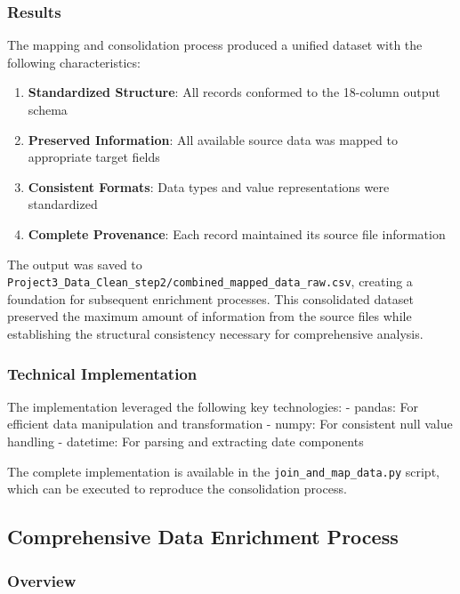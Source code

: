 \documentclass[12pt]{article}
\providecommand{\tightlist}{%
  \setlength{\itemsep}{0pt}\setlength{\parskip}{0pt}}
\begin{document}
\subsubsection{Results}\label{results}

The mapping and consolidation process produced a unified dataset with
the following characteristics:

\begin{enumerate}
\def\labelenumi{\arabic{enumi}.}
\tightlist
\item
  \textbf{Standardized Structure}: All records conformed to the
  18-column output schema
\item
  \textbf{Preserved Information}: All available source data was mapped
  to appropriate target fields
\item
  \textbf{Consistent Formats}: Data types and value representations were
  standardized
\item
  \textbf{Complete Provenance}: Each record maintained its source file
  information
\end{enumerate}

The output was saved to
\texttt{Project3\_Data\_Clean\_step2/combined\_mapped\_data\_raw.csv},
creating a foundation for subsequent enrichment processes. This
consolidated dataset preserved the maximum amount of information from
the source files while establishing the structural consistency necessary
for comprehensive analysis.

\subsubsection{Technical
Implementation}\label{technical-implementation-1}

The implementation leveraged the following key technologies: - pandas:
For efficient data manipulation and transformation - numpy: For
consistent null value handling - datetime: For parsing and extracting
date components

The complete implementation is available in the
\texttt{join\_and\_map\_data.py} script, which can be executed to
reproduce the consolidation process.

\subsection{Comprehensive Data Enrichment
Process}\label{comprehensive-data-enrichment-process}

\subsubsection{Overview}\label{overview-2}
\end{document}
